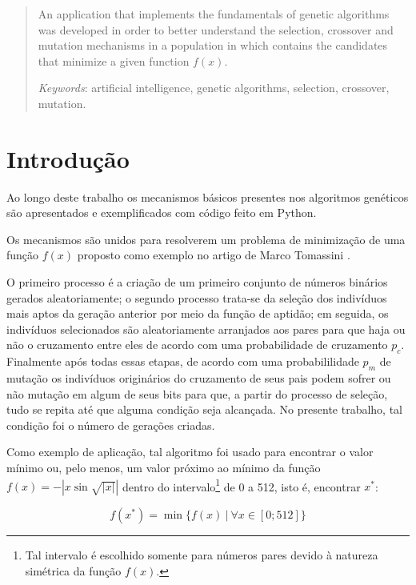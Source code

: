 \documentclass[11pt]{article}
\begin{document}
\begin{otherlanguage}{english}
\begin{abstract}
An application that implements the fundamentals of genetic algorithms was developed in order to better understand the selection, crossover and mutation mechanisms in a population in which contains the candidates that minimize a given function $f(x)$.

\emph{Keywords}: artificial intelligence, genetic algorithms, selection, crossover, mutation.
\end{abstract}
\end{otherlanguage}

\newpage
\tableofcontents
\newpage

\section{Introdução}

Ao longo deste trabalho os mecanismos básicos presentes nos algoritmos genéticos são apresentados e exemplificados com código feito em Python.

Os mecanismos são unidos para resolverem um problema de minimização de uma função $f(x)$ proposto como exemplo no artigo de Marco Tomassini \cite{Tomassini}.

O primeiro processo é a criação de um primeiro conjunto de números binários gerados aleatoriamente; o segundo processo trata-se da seleção dos indivíduos mais aptos da geração anterior por meio da função de aptidão; em seguida, os indivíduos selecionados são aleatoriamente arranjados aos pares para que haja ou não o cruzamento entre eles de acordo com uma probabilidade de cruzamento $p_c$. Finalmente após todas essas etapas, de acordo com uma probabililidade $p_m$ de mutação os indivíduos originários do cruzamento de seus pais podem sofrer ou não mutação em algum de seus bits para que, a partir do processo de seleção, tudo se repita até que alguma condição seja alcançada. No presente trabalho, tal condição foi o número de gerações criadas.

Como exemplo de aplicação, tal algoritmo foi usado para encontrar o valor mínimo ou, pelo menos, um valor próximo ao mínimo da função $f(x) = - \left| x \sin{\sqrt{\left| x\right| }}\right| $ dentro do intervalo\footnote{Tal intervalo é escolhido somente para números pares devido à natureza simétrica da função $f(x)$.} de 0 a 512, isto é, encontrar $x^*$:

\begin{equation*}
f(x^*) = \min \{ f(x) ~ | ~ \forall x \in [0; 512] \}
\end{equation*}
\end{document}
